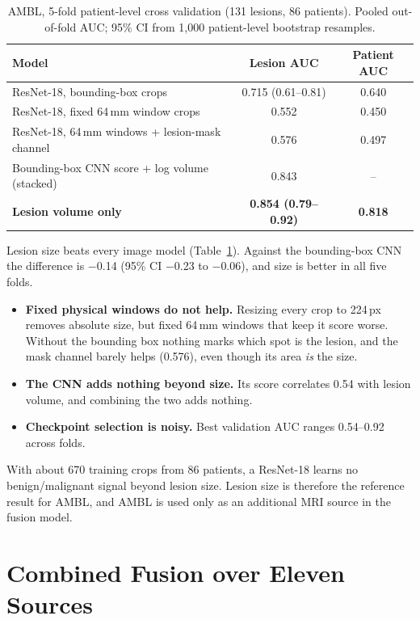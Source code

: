 \documentclass[11pt]{article}
\begin{document}
\begin{table}[htbp]
  \centering
  \caption{AMBL, 5-fold patient-level cross validation (131 lesions, 86 patients). Pooled out-of-fold AUC; 95\% CI from 1,000 patient-level bootstrap resamples.}
  \label{tab:ambl}
  \begin{tabular}{@{}l c c@{}}
    \toprule
    Model & Lesion AUC & Patient AUC \\
    \midrule
    ResNet-18, bounding-box crops & 0.715 (0.61--0.81) & 0.640 \\
    ResNet-18, fixed 64\,mm window crops & 0.552 & 0.450 \\
    ResNet-18, 64\,mm windows + lesion-mask channel & 0.576 & 0.497 \\
    Bounding-box CNN score + log volume (stacked) & 0.843 & -- \\
    \textbf{Lesion volume only} & \textbf{0.854 (0.79--0.92)} & \textbf{0.818} \\
    \bottomrule
  \end{tabular}
\end{table}

Lesion size beats every image model (Table~\ref{tab:ambl}). Against the
bounding-box CNN the difference is $-$0.14 (95\% CI $-$0.23 to $-$0.06), and
size is better in all five folds.
\begin{itemize}
  \item \textbf{Fixed physical windows do not help.} Resizing every crop to
    224\,px removes absolute size, but fixed 64\,mm windows that keep it score
    worse. Without the bounding box nothing marks which spot is the lesion,
    and the mask channel barely helps (0.576), even though its area \emph{is}
    the size.
  \item \textbf{The CNN adds nothing beyond size.} Its score correlates 0.54
    with lesion volume, and combining the two adds nothing.
  \item \textbf{Checkpoint selection is noisy.} Best validation AUC ranges
    0.54--0.92 across folds.
\end{itemize}
With about 670 training crops from 86 patients, a ResNet-18 learns no
benign/malignant signal beyond lesion size. Lesion size is therefore the
reference result for AMBL, and AMBL is used only as an additional MRI source
in the fusion model.

\section{Combined Fusion over Eleven Sources}
\label{sec:phase2}
\end{document}
